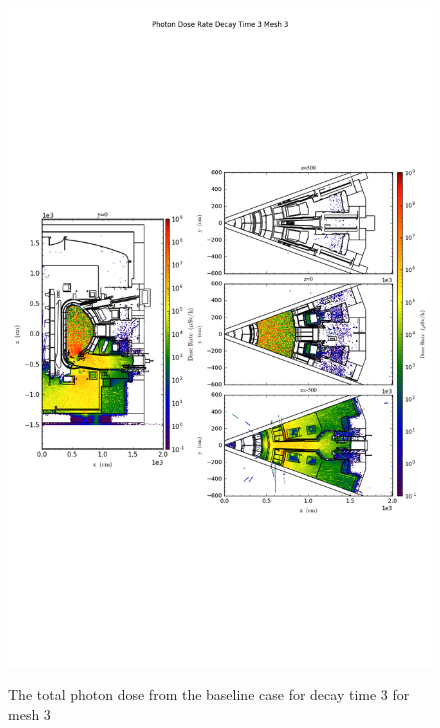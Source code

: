 \begin{figure}[ht!]
\centering
\includegraphics[trim={0cm 9cm 0cm 10cm},clip,scale=0.75]{../plots/final_model_nob4c/Photon_Dose_Rate_Decay_Time_3_Mesh_3.png}
\label{fig:photons_dc3_no4bc_m3_flux}
\caption{The total photon dose from the baseline case for decay time 3 for mesh 3}
\end{figure}
